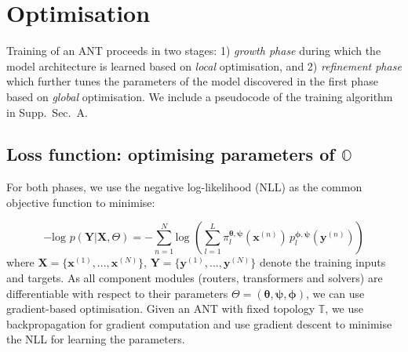 \section{Optimisation}\label{sec:learning}
Training of an ANT proceeds in two stages: 1) \textit{growth phase} during which the model architecture is learned based on \textit{local} optimisation, and 2) \textit{refinement phase} which further tunes the parameters of the model discovered in the first phase based on \textit{global} optimisation. We include a pseudocode of the training algorithm in Supp.~Sec.~A. %

\subsection{Loss function: optimising parameters of \texorpdfstring{$\mathbb{O}$}{O}}\label{sec:graddescent}
For both phases, we use the negative log-likelihood (NLL) as the common objective function to minimise: 

$$-\text{log }p(\mathbf{Y}|\mathbf{X}, \Theta) = -\sum_{n=1}^N\text{log }(\sum_{l=1}^{L} \pi_{l}^{\boldsymbol{\theta}, \boldsymbol{\psi}}(\mathbf{x}^{(n)})\,
p_{l}^{\boldsymbol{\phi}, \boldsymbol{\psi}}(\mathbf{y}^{(n)}))$$ where $\mathbf{X} = \{\mathbf{x}^{(1)}, ..., \mathbf{x}^{(N)}\}$, $\mathbf{Y} = \{\mathbf{y}^{(1)}, ..., \mathbf{y}^{(N)}\}$ denote the training inputs and targets. As all component modules (routers, transformers and solvers) are differentiable with respect to their parameters $\Theta = (\boldsymbol{\theta}, \boldsymbol{\psi}, \boldsymbol{\phi})$, we can use gradient-based optimisation. Given an ANT with fixed topology  $\mathbb{T}$, we use backpropagation \cite{rumelhart1986learning} for gradient computation and use gradient descent to minimise the NLL for learning the parameters.

